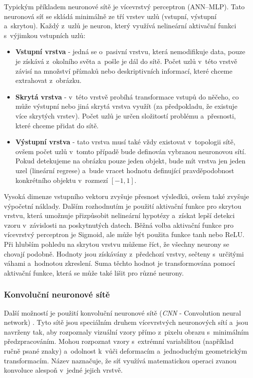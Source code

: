 Typickým příkladem neuronové sítě je vícevrstvý perceptron (ANN--MLP). Tato neuronová síť se skládá minimálně ze tří vrstev uzlů (vstupní, výstupní a~skrytou). Každý z~uzlů je neuron, který využívá nelineární aktivační funkci s~výjimkou vstupních uzlů:
\begin{itemize}
  \item{\textbf{Vstupní vrstva} - jedná se o~pasivní vrstvu, která nemodifikuje data, pouze je získává z~okolního světa a~pošle je dál do sítě. Počet uzlů v~této vrstvě závisí na množství příznaků nebo deskriptivních informací, které chceme extrahovat z~obrázku.}
  \item{\textbf{Skrytá vrstva} - v~této vrstvě probíhá transformace vstupů do něčeho, co může výstupní nebo jiná skrytá vrstva využít (za předpokladu, že existuje více skrytých vrstev). Počet uzlů je určen složitostí problému a~přesnosti, které chceme přidat do sítě. }
  \item{\textbf{Výstupní vrstva} - tato vrstva musí také vždy existovat v~topologii sítě, ovšem počet uzlů v~tomto případě bude definován vybranou neuronovou sítí. Pokud detekujeme na obrázku pouze jeden objekt, bude mít vrstva jen jeden uzel (lineární regrese) a~bude vracet hodnotu definující pravděpodobnost konkrétního objektu v~rozmezí $[-1,1]$.}
\end{itemize}

Vysoká dimenze vstupního vektoru zvyšuje přesnost výsledků, ovšem také zvyšuje výpočetní náklady. Dalším rozhodnutím je použití aktivační funkce pro skrytou vrstvu, která umožnuje přizpůsobit nelineární hypotézy a~získat lepší detekci vzoru v~závislosti na poskytnutých datech. Běžná volba aktivační funkce pro vícevrstvý perceptron je Sigmoid, ale může být použita funkce tanh nebo ReLU. Při hlubším pohledu na skrytou vrstvu můžeme říct, že všechny neurony se chovají podobně. Hodnoty jsou získávány z~předchozí vrstvy, sečteny s~určitými váhami a~hodnotou zkreslení.
Suma těchto hodnot je transformována pomocí aktivační funkce, která se může také lišit pro různé neurony.


\subsubsection*{Konvoluční neuronové sítě}
Další možností je použití konvoluční neuronové sítě (\textit{CNN} - Convolution neural network) \cite{lenet}. Tyto sítě jsou speciálním druhem vícevrstvých neuronových sítí a~jsou navrženy tak, aby rozpoznaly vizuální vzory přímo z~pixelu obrazu s~minimálním předzpracováním. Mohou rozpoznat vzory s~extrémní variabilitou (například ručně psané znaky) a~odolnost k~vůči deformacím a~jednoduchým geometrickým transformacím. Název  naznačuje, že síť využívá matematickou operaci zvanou konvoluce alespoň v~jedné jejich vrstvě.

